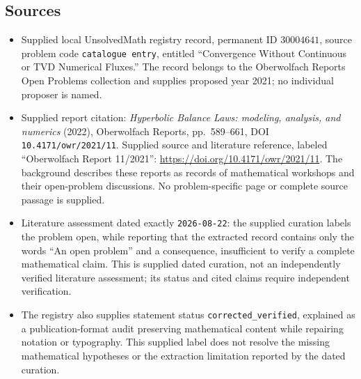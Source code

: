 \documentclass[11pt]{article}
\begin{document}
\subsection{Sources}
\begin{itemize}
\item Supplied local UnsolvedMath registry record, permanent ID \(30004641\), source problem code \texttt{catalogue entry}, entitled ``Convergence Without Continuous or TVD Numerical Fluxes.'' The record belongs to the Oberwolfach Reports Open Problems collection and supplies proposed year 2021; no individual proposer is named.
\item Supplied report citation: \emph{Hyperbolic Balance Laws: modeling, analysis, and numerics} (2022), Oberwolfach Reports, pp.\ 589--661, DOI \texttt{10.4171/owr/2021/11}. Supplied source and literature reference, labeled ``Oberwolfach Report 11/2021'': \url{https://doi.org/10.4171/owr/2021/11}. The background describes these reports as records of mathematical workshops and their open-problem discussions. No problem-specific page or complete source passage is supplied.
\item Literature assessment dated exactly \texttt{2026-08-22}: the supplied curation labels the problem open, while reporting that the extracted record contains only the words ``An open problem'' and a consequence, insufficient to verify a complete mathematical claim. This is supplied dated curation, not an independently verified literature assessment; its status and cited claims require independent verification.
\item The registry also supplies statement status \texttt{corrected\_verified}, explained as a publication-format audit preserving mathematical content while repairing notation or typography. This supplied label does not resolve the missing mathematical hypotheses or the extraction limitation reported by the dated curation.
\end{itemize}
\end{document}
